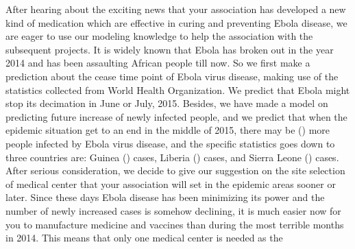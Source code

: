 \documentclass[11pt]{article}
\begin{document}
    After hearing about the exciting news that your association has developed a new kind of medication which are effective in curing and preventing Ebola disease, we are eager to use our modeling knowledge to help the association with the subsequent projects. 
    It is widely known that Ebola has broken out in the year 2014 and has been assaulting African people till now. So we first make a prediction about the cease time point of Ebola virus disease, making use of the statistics collected from World Health Organization. We predict that Ebola might stop its decimation in June or July, 2015. Besides, we have made a model on predicting future increase of newly infected people, and we predict that when the epidemic situation get to an end in the middle of 2015, there may be () more people infected by Ebola virus disease, and the specific statistics goes down to three countries are: Guinea () cases, Liberia () cases, and Sierra Leone () cases. After serious consideration, we decide to give our suggestion on the site selection of medical center that your association will set in the epidemic areas sooner or later. Since these days Ebola disease has been minimizing its power and the number of newly increased cases is somehow declining, it is much easier now for you to manufacture medicine and vaccines than during the most terrible months in 2014. This means that only one medical center is needed as the 







\medskip


\end{document}
